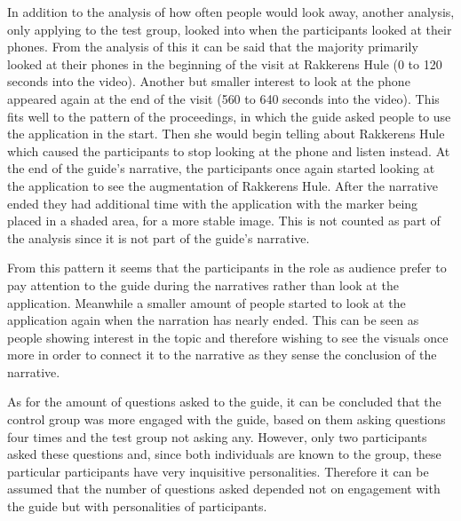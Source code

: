 In addition to the analysis of how often people would look away, another analysis, only applying to the test group, looked into when the participants looked at their phones. From the analysis of this it can be said that the majority primarily looked at their phones in the beginning of the visit at Rakkerens Hule (0 to 120 seconds into the video). Another but smaller interest to look at the phone appeared again at the end of the visit (560 to 640 seconds into the video). This fits well to the pattern of the proceedings, in which the guide asked people to use the application in the start. Then she would begin telling about Rakkerens Hule which caused the participants to stop looking at the phone and listen instead. At the end of the guide’s narrative, the participants once again started looking at the application to see the augmentation of Rakkerens Hule. After the narrative ended they had additional time with the application with the marker being placed in a shaded area, for a more stable image. This is not counted as part of the analysis since it is not part of the guide’s narrative.

From this pattern it seems that the participants in the role as audience prefer to pay attention to the guide during the narratives rather than look at the application. Meanwhile a smaller amount of people started to look at the application again when the narration has nearly ended. This can be seen as people showing interest in the topic and therefore wishing to see the visuals once more in order to connect it to the narrative as they sense the conclusion of the narrative. 

As for the amount of questions asked to the guide, it can be concluded that the control group was more engaged with the guide, based on them asking questions four times and the test group not asking any. However, only two participants asked these questions and, since both individuals are known to the group, these particular participants have very inquisitive personalities. Therefore it can be assumed that the number of questions asked depended not on engagement with the guide but with personalities of participants. 

